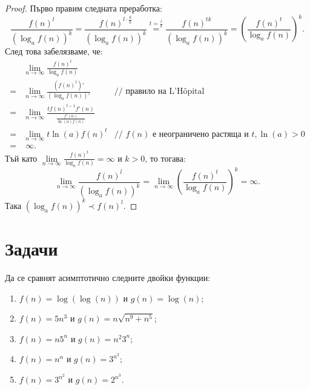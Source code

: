 \begin{proof}
  Първо правим следната преработка:
  \[
    \frac{f(n)^{l}}{(\log_a f(n))^k} = \frac{f(n)^{l \cdot \frac{k}{k}}}{(\log_a f(n))^k} \stackrel{t = \frac{l}{k}}{=} \frac{f(n)^{tk}}{(\log_a f(n))^k} = \left( \frac{f(n)^t}{\log_a f(n)} \right)^k.
  \]
  След това забелязваме, че:
  \begin{align*}
      & \lim\limits_{n \to \infty} \frac{f(n)^t}{\log_a f(n)}                             &                                                                 \\
    = & \lim\limits_{n \to \infty} \frac{(f(n)^t)'}{(\log_a f(n))'}                       & \text{// правило на L'Hôpital}                                  \\
    = & \lim\limits_{n \to \infty} \frac{t f(n)^{t - 1} f'(n)}{\frac{f'(n)}{\ln(a) f(n)}} &                                                                 \\
    = & \lim\limits_{n \to \infty} t \ln(a) f(n)^t                                        & \text{// } f(n) \text{ е неограничено растяща и } t, \ln(a) > 0 \\
    = & \;\infty.                                                                         &
  \end{align*}
  Тъй като $\lim\limits_{n \to \infty} \frac{f(n)^t}{\log_a f(n)} = \infty$ и $k > 0$, то тогава:
  \[
    \lim\limits_{n \to \infty} \frac{f(n)^{l}}{(\log_a f(n))^k} = \lim\limits_{n \to \infty} \left( \frac{f(n)^t}{\log_a f(n)} \right)^k = \infty.
  \]
  Така $(\log_a f(n))^{k} \prec f(n)^{l}$.
\end{proof}

\section{Задачи}

\begin{problem}
Да се сравнят асимптотично следните двойки функции:
\begin{enumerate}
  \item $f(n) = \log(\log(n))$ и $g(n) = \log(n)$;
  \item $f(n) = 5n^3$ и $g(n) = n \sqrt{n^9 + n^5}$;
  \item $f(n) = n 5^n$ и $g(n) = n^ 2 3^n$;
  \item $f(n) = n^n$ и $g(n) = 3^{n^2}$;
  \item $f(n) = 3^{n^2}$ и $g(n) = 2^{n^3}$.
\end{enumerate}
\end{problem}


